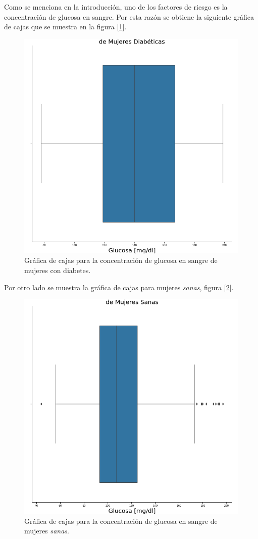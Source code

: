 \documentclass{article}
\begin{document}
Como se menciona en la introducción, uno de los factores de riesgo es la concentración de glucosa en sangre. Por esta razón se obtiene la siguiente gráfica de cajas que se muestra en la figura  [\ref{fig:glucosa_diabetes}].

\begin{figure}[H]
	\centering
	\includegraphics[width=0.65\linewidth]{glucosa_diabetes.png}
	\caption{Gráfica de cajas para la concentración de glucosa en sangre de mujeres con diabetes.}%
	\label{fig:glucosa_diabetes}
\end{figure}

Por otro lado se muestra la gráfica de cajas para mujeres \emph{sanas}, figura [\ref{fig:glucosa_sanas}].

\begin{figure}[H]
	\centering
	\includegraphics[width=0.65\linewidth]{glucosa_sanas.png}
	\caption{Gráfica de cajas para la concentración de glucosa en sangre de mujeres \emph{sanas}.}%
	\label{fig:glucosa_sanas}
\end{figure}
\end{document}
